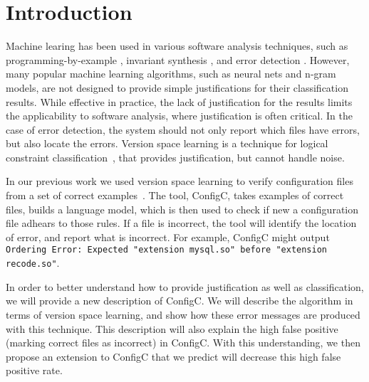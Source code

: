 \section{Introduction}

Machine learing has been used in various software analysis techniques, such as programming-by-example \cite{lau2000version}, invariant synthesis \cite{garg2014ice}, and error detection \cite{Santolucito2016}.
However, many popular machine learning algorithms, such as neural nets and n-gram models, are not designed to provide simple justifications for their classification results.
While effective in practice, the lack of justification for the results limits the applicability to software analysis, where justification is often critical.
In the case of error detection, the system should not only report which files have errors, but also locate the errors.
Version space learning is a technique for logical constraint classification~\cite{mitchell82}, that provides justification, but cannot handle noise.


In our previous work we used version space learning to verify configuration files from a set of correct examples~\cite{Santolucito2016}.
The tool, ConfigC, takes examples of correct files, builds a language model, which is then used to check if new a configuration file adhears to those rules.
If a file is incorrect, the tool will identify the location of error, and report what is incorrect.
For example, ConfigC might output \texttt{Ordering Error: Expected "extension mysql.so" before "extension recode.so"}.

In order to better understand how to provide justification as well as classification, we will provide a new description of ConfigC.
We will describe the algorithm in terms of version space learning, and show how these error messages are produced with this technique.
This description will also explain the high false positive (marking correct files as incorrect) in ConfigC.
With this understanding, we then propose an extension to ConfigC that we predict will decrease this high false positive rate.

